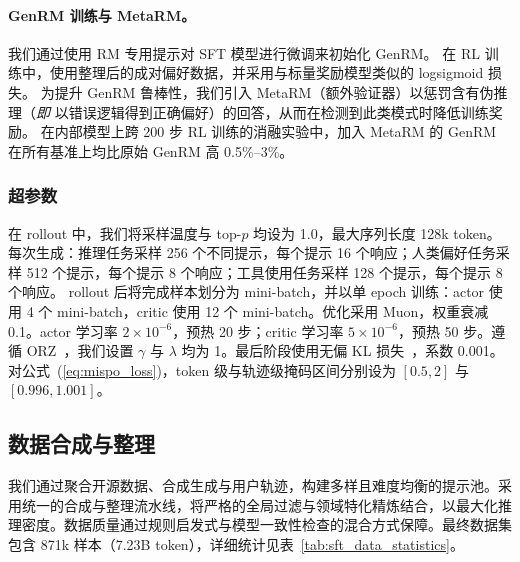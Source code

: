 \paragraph{GenRM 训练与 MetaRM。}
我们通过使用 RM 专用提示对 SFT 模型进行微调来初始化 GenRM。
在 RL 训练中，使用整理后的成对偏好数据，并采用与标量奖励模型类似的 logsigmoid 损失。
为提升 GenRM 鲁棒性，我们引入 MetaRM（额外验证器）以惩罚含有伪推理（\textit{即} 以错误逻辑得到正确偏好）的回答，从而在检测到此类模式时降低训练奖励。
在内部模型上跨 200 步 RL 训练的消融实验中，加入 MetaRM 的 GenRM 在所有基准上均比原始 GenRM 高 0.5\%–3\%。

\subsubsection{超参数}
\label{sec:rl_hyperparameter}
在 rollout 中，我们将采样温度与 top-$p$ 均设为 1.0，最大序列长度 128k token。
每次生成：推理任务采样 256 个不同提示，每个提示 16 个响应；人类偏好任务采样 512 个提示，每个提示 8 个响应；工具使用任务采样 128 个提示，每个提示 8 个响应。
rollout 后将完成样本划分为 mini-batch，并以单 epoch 训练：actor 使用 4 个 mini-batch，critic 使用 12 个 mini-batch。优化采用 Muon，权重衰减 0.1。actor 学习率 $2 \times 10^{-6}$，预热 20 步；critic 学习率 $5 \times 10^{-6}$，预热 50 步。遵循 ORZ~\cite{hu2025openreasonerzero}，我们设置 $\gamma$ 与 $\lambda$ 均为 1。最后阶段使用无偏 KL 损失~\cite{liu2025deepseek}，系数 0.001。对公式~(\ref{eq:mispo_loss})，token 级与轨迹级掩码区间分别设为 $[0.5, 2]$ 与 $[0.996, 1.001]$。


\subsection{数据合成与整理}
我们通过聚合开源数据、合成生成与用户轨迹，构建多样且难度均衡的提示池。采用统一的合成与整理流水线，将严格的全局过滤与领域特化精炼结合，以最大化推理密度。数据质量通过规则启发式与模型一致性检查的混合方式保障。最终数据集包含 871k 样本（7.23B token），详细统计见表~\ref{tab:sft_data_statistics}。


